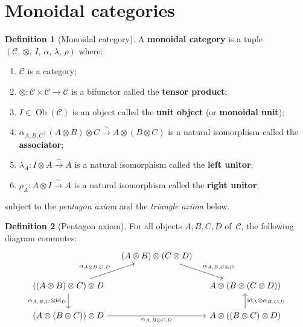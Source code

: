 \documentclass[a4paper,12pt]{book}
\DeclareMathOperator{\Ob}{Ob}
\newcommand{\id}{\mathrm{id}}
\theoremstyle{definition}
\newtheorem{definition}{Definition}[section]
\theoremstyle{plain}
\theoremstyle{remark}
\begin{document}

\section{Monoidal categories}\label{sec:monoidal-cats}

\begin{definition}[Monoidal category]\label{def:monoidal-cat}
A \textbf{monoidal category} is a tuple
$(\mathcal{C},\, \otimes,\, I,\, \alpha,\, \lambda,\, \rho)$ where:
\begin{enumerate}[label=(\roman*)]
\item $\mathcal{C}$ is a category;
\item $\otimes \colon \mathcal{C}\times\mathcal{C}\to\mathcal{C}$ is a
      bifunctor called the \textbf{tensor product};
\item $I \in \Ob(\mathcal{C})$ is an object called the \textbf{unit object}
      (or \textbf{monoidal unit});
\item $\alpha_{A,B,C}\colon (A\otimes B)\otimes C
      \xrightarrow{\;\sim\;} A\otimes(B\otimes C)$
      is a natural isomorphism called the \textbf{associator};
\item $\lambda_A \colon I\otimes A \xrightarrow{\;\sim\;} A$
      is a natural isomorphism called the \textbf{left unitor};
\item $\rho_A \colon A\otimes I \xrightarrow{\;\sim\;} A$
      is a natural isomorphism called the \textbf{right unitor};
\end{enumerate}
subject to the \emph{pentagon axiom} and the \emph{triangle axiom} below.
\end{definition}

\begin{definition}[Pentagon axiom]\label{def:pentagon}
For all objects $A,B,C,D$ of~$\mathcal{C}$, the following diagram commutes:
\[
\begin{tikzcd}[column sep=small]
& (A\otimes B)\otimes(C\otimes D) \arrow[dr, "\alpha_{A,B,C\otimes D}"] & \\
((A\otimes B)\otimes C)\otimes D
  \arrow[ur, "\alpha_{A\otimes B,C,D}"]
  \arrow[d, "\alpha_{A,B,C}\otimes\id_D"'] & &
A\otimes(B\otimes(C\otimes D)) \\
(A\otimes(B\otimes C))\otimes D
  \arrow[rr, "\alpha_{A,B\otimes C,D}"'] & &
A\otimes((B\otimes C)\otimes D)
  \arrow[u, "\id_A\otimes\alpha_{B,C,D}"']
\end{tikzcd}
\]
\end{definition}
\end{document}
